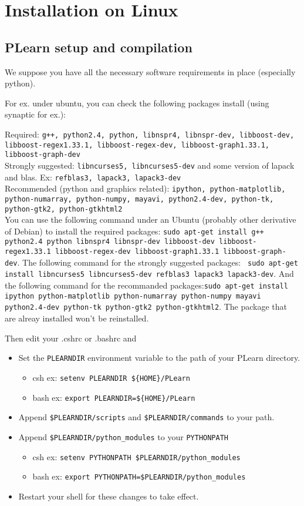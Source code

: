 \documentclass[11pt]{book}
\begin{document}
\section{Installation on Linux}

\subsection{PLearn setup and compilation}

We suppose you have all the necessary software requirements in place (especially python).

For ex. under ubuntu, you can check the following packages install (using
synaptic for ex.):

Required:
{\tt g++, python2.4, python, libnspr4, libnspr-dev, libboost-dev,
libboost-regex1.33.1, libboost-regex-dev, libboost-graph1.33.1, libboost-graph-dev} \\
Strongly suggested: \verb!libncurses5, libncurses5-dev! and some version of lapack and blas. Ex:
{\tt refblas3, lapack3, lapack3-dev} \\
Recommended (python and graphics related):
{\tt ipython, python-matplotlib, 
python-numarray, python-numpy, mayavi, python2.4-dev,
python-tk, python-gtk2, python-gtkhtml2} \\

You can use the following command under an Ubuntu (probably other derivative of Debian) to install the required packages: \verb!sudo apt-get install g++ python2.4 python libnspr4 libnspr-dev libboost-dev libboost-regex1.33.1 libboost-regex-dev libboost-graph1.33.1 libboost-graph-dev!.
The following command for the strongly suggested packages: \verb! sudo apt-get install libncurses5 libncurses5-dev refblas3 lapack3 lapack3-dev!.
And the following command for the recommanded packages:\verb!sudo apt-get install ipython python-matplotlib python-numarray python-numpy mayavi python2.4-dev python-tk python-gtk2 python-gtkhtml2!. The package that are alreay installed won't be reinstalled.

Then edit your .cshrc or .bashrc and 
\begin{itemize}
\item Set the {\tt PLEARNDIR} environment variable to the path of your PLearn directory. 
\begin{itemize}
\item csh ex: \verb!setenv PLEARNDIR ${HOME}/PLearn!
\item bash ex: \verb!export PLEARNDIR=${HOME}/PLearn!
\end{itemize}
\item Append \verb!$PLEARNDIR/scripts! and \verb!$PLEARNDIR/commands! to your path.
\item Append \verb!$PLEARNDIR/python_modules! to your \verb!PYTHONPATH!
\begin{itemize}
\item csh ex: \verb!setenv PYTHONPATH $PLEARNDIR/python_modules!
\item bash ex: \verb!export PYTHONPATH=$PLEARNDIR/python_modules!
\end{itemize}
\item Restart your shell for these changes to take effect.
\end{itemize}
\end{document}
